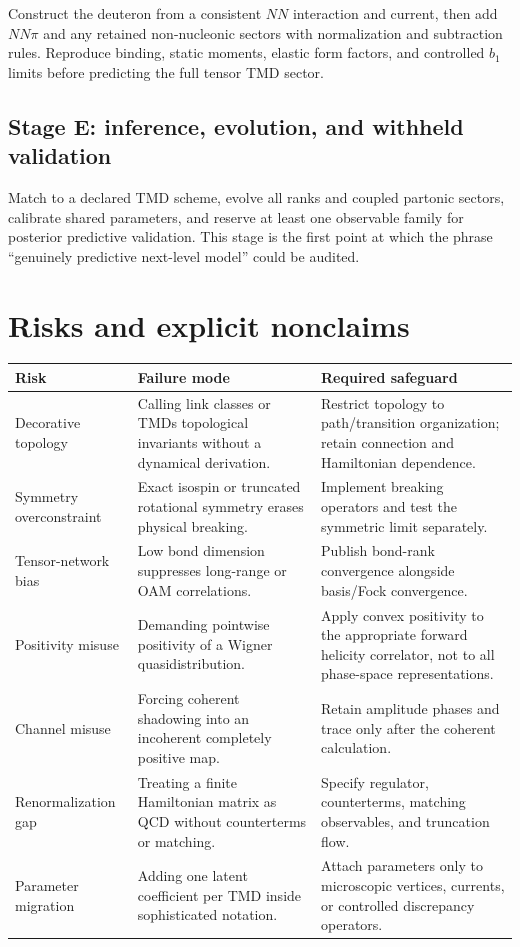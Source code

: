 \documentclass[11pt]{article}
\begin{document}
Construct the deuteron from a consistent \(NN\) interaction and current,
then add \(NN\pi\) and any retained non-nucleonic sectors with normalization
and subtraction rules.  Reproduce binding, static moments, elastic form
factors, and controlled \(b_1\) limits before predicting the full tensor TMD
sector.

\subsection{Stage E: inference, evolution, and withheld validation}

Match to a declared TMD scheme, evolve all ranks and coupled partonic
sectors, calibrate shared parameters, and reserve at least one observable
family for posterior predictive validation.  This stage is the first point
at which the phrase ``genuinely predictive next-level model'' could be
audited.

\section{Risks and explicit nonclaims}

\begin{longtable}{L{0.25\textwidth}L{0.34\textwidth}L{0.33\textwidth}}
\toprule
Risk & Failure mode & Required safeguard\\
\midrule
\endhead
Decorative topology &
Calling link classes or TMDs topological invariants without a dynamical
derivation. &
Restrict topology to path/transition organization; retain connection and
Hamiltonian dependence.\\
Symmetry overconstraint &
Exact isospin or truncated rotational symmetry erases physical breaking. &
Implement breaking operators and test the symmetric limit separately.\\
Tensor-network bias &
Low bond dimension suppresses long-range or OAM correlations. &
Publish bond-rank convergence alongside basis/Fock convergence.\\
Positivity misuse &
Demanding pointwise positivity of a Wigner quasidistribution. &
Apply convex positivity to the appropriate forward helicity correlator,
not to all phase-space representations.\\
Channel misuse &
Forcing coherent shadowing into an incoherent completely positive map. &
Retain amplitude phases and trace only after the coherent calculation.\\
Renormalization gap &
Treating a finite Hamiltonian matrix as QCD without counterterms or
matching. &
Specify regulator, counterterms, matching observables, and truncation flow.\\
Parameter migration &
Adding one latent coefficient per TMD inside sophisticated notation. &
Attach parameters only to microscopic vertices, currents, or controlled
discrepancy operators.\\
\bottomrule
\end{longtable}
\end{document}
